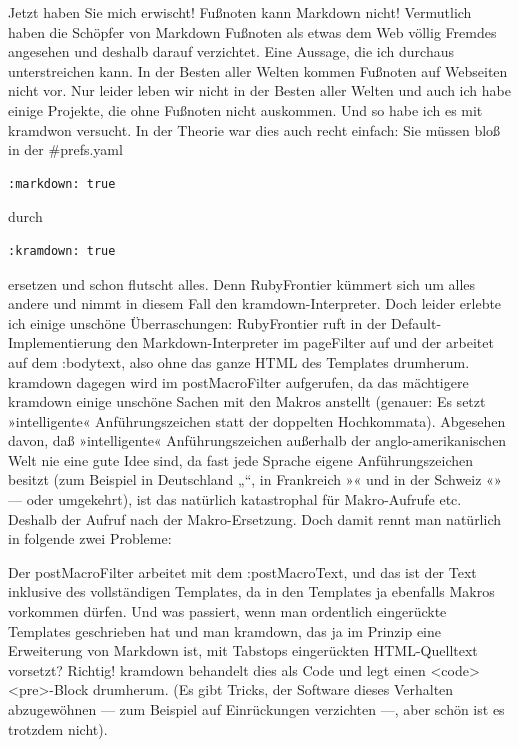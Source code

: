 \documentclass[11pt]{report}
\begin{document}
Jetzt haben Sie mich erwischt! Fußnoten kann Markdown nicht! Vermutlich haben die Schöpfer von Markdown Fußnoten als etwas dem Web völlig Fremdes angesehen und deshalb darauf verzichtet. Eine Aussage, die ich durchaus unterstreichen kann. In der Besten aller Welten kommen Fußnoten auf Webseiten nicht vor. Nur leider leben wir nicht in der Besten aller Welten und auch ich habe einige Projekte, die ohne Fußnoten nicht auskommen. Und so habe ich es mit kramdwon versucht. In der Theorie war dies auch recht einfach: Sie müssen bloß in der \#prefs.yaml


\begin{verbatim}
:markdown: true
\end{verbatim}

durch


\begin{verbatim}
:kramdown: true
\end{verbatim}


ersetzen und schon flutscht alles. Denn RubyFrontier kümmert sich um
alles andere und nimmt in diesem Fall den kramdown-Interpreter. Doch
leider erlebte ich einige unschöne Überraschungen: RubyFrontier ruft
in der Default-Implementierung den Markdown-Interpreter im pageFilter
auf und der arbeitet auf dem :bodytext, also ohne das ganze HTML des
Templates drumherum. kramdown dagegen wird im postMacroFilter
aufgerufen, da das mächtigere kramdown einige unschöne Sachen mit den
Makros anstellt (genauer: Es setzt »intelligente« Anführungszeichen
statt der doppelten Hochkommata). Abgesehen davon, daß »intelligente«
Anführungszeichen außerhalb der anglo-amerikanischen Welt nie eine
gute Idee sind, da fast jede Sprache eigene Anführungszeichen besitzt
(zum Beispiel in Deutschland „“, in Frankreich »« und in der Schweiz
«» — oder umgekehrt), ist das natürlich katastrophal für Makro-Aufrufe
etc. Deshalb der Aufruf nach der Makro-Ersetzung. Doch damit rennt man
natürlich in folgende zwei Probleme:


Der postMacroFilter arbeitet mit dem :postMacroText, und das ist der
Text inklusive des vollständigen Templates, da in den Templates ja
ebenfalls Makros vorkommen dürfen. Und was passiert, wenn man
ordentlich eingerückte Templates geschrieben hat und man kramdown, das
ja im Prinzip eine Erweiterung von Markdown ist, mit Tabstops
eingerückten HTML-Quelltext vorsetzt? Richtig! kramdown behandelt dies
als Code und legt einen <code><pre>-Block drumherum. (Es gibt Tricks,
der Software dieses Verhalten abzugewöhnen — zum Beispiel auf
Einrückungen verzichten —, aber schön ist es trotzdem nicht).
\end{document}
